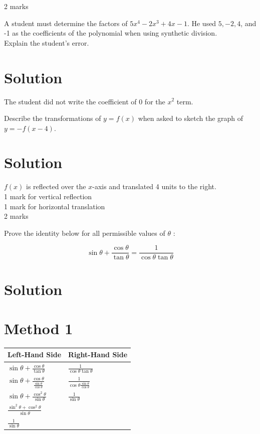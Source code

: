 \documentclass[10pt]{article}
\begin{document}
2 marks

A student must determine the factors of $5 x^{4}-2 x^{3}+4 x-1$. He used $5,-2,4$, and -1 as the coefficients of the polynomial when using synthetic division.\\
Explain the student's error.

\section*{Solution}
The student did not write the coefficient of 0 for the $x^{2}$ term.

Describe the transformations of $y=f(x)$ when asked to sketch the graph of $y=-f(x-4)$.

\section*{Solution}
$f(x)$ is reflected over the $x$-axis and translated 4 units to the right.\\
1 mark for vertical reflection\\
1 mark for horizontal translation\\
2 marks

Prove the identity below for all permissible values of $\theta$ :

$$
\sin \theta+\frac{\cos \theta}{\tan \theta}=\frac{1}{\cos \theta \tan \theta}
$$

\section*{Solution}
\section*{Method 1}
\begin{center}
\begin{tabular}{|l|l|}
\hline
Left-Hand Side & Right-Hand Side \\
\hline
$\sin \theta+\frac{\cos \theta}{\tan \theta}$ & $\frac{1}{\cos \theta \tan \theta}$ \\
\hline
$\sin \theta+\frac{\cos \theta}{\frac{\sin \theta}{\cos \theta}}$ & $\frac{1}{\cos \theta \frac{\sin \theta}{\cos \theta}}$ \\
\hline
$\sin \theta+\frac{\cos ^{2} \theta}{\sin \theta}$ & $\frac{1}{\sin \theta}$ \\
\hline
$\frac{\sin ^{2} \theta+\cos ^{2} \theta}{\sin \theta}$ &  \\
\hline
$\frac{1}{\sin \theta}$ &  \\
\hline
\end{tabular}
\end{center}
\end{document}
